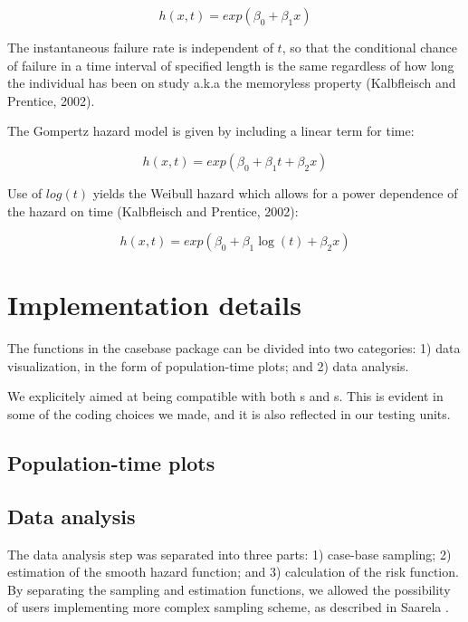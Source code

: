 \documentclass[article]{jss}
\begin{document}
\[ h(x,t) = exp(\beta_0 + \beta_1 x) \]

The instantaneous failure rate is independent of \(t\), so that the
conditional chance of failure in a time interval of specified length is
the same regardless of how long the individual has been on study a.k.a
the memoryless property (Kalbfleisch and Prentice, 2002).

The Gompertz hazard model is given by including a linear term for time:

\[ h(x,t)  = exp(\beta_0 + \beta_1 t + \beta_2 x) \]

Use of \(log(t)\) yields the Weibull hazard which allows for a power
dependence of the hazard on time (Kalbfleisch and Prentice, 2002):

\[ h(x, t)  = exp(\beta_0 + \beta_1 \log(t) + \beta_2 x) \]

\section{Implementation details}\label{implementation-details}

The functions in the casebase package can be divided into two
categories: 1) data visualization, in the form of population-time plots;
and 2) data analysis.

We explicitely aimed at being compatible with both s
and s. This is evident in some of the coding choices we
made, and it is also reflected in our testing units.

\subsection{Population-time plots}\label{population-time-plots}

\subsection{Data analysis}\label{data-analysis}

The data analysis step was separated into three parts: 1) case-base
sampling; 2) estimation of the smooth hazard function; and 3)
calculation of the risk function. By separating the sampling and
estimation functions, we allowed the possibility of users implementing
more complex sampling scheme, as described in Saarela
\citeyearpar{saarela2016case}.
\end{document}
